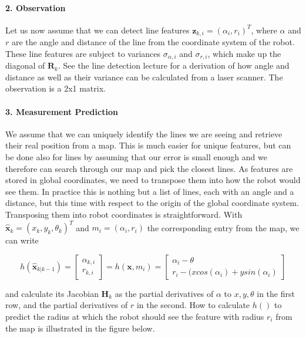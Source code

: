 \paragraph{2. Observation}
Let us now assume that we can detect line features $ \boldsymbol{z}_{k,i}=(\alpha_i,r_i)^T$, where $ \alpha$ and $ r$ are the angle and distance of the line from the coordinate system of the robot. These line features are subject to variances $ \sigma_{\alpha,i}$ and $ \sigma_{r,i}$, which make up the diagonal of $ \boldsymbol{R}_{k}$. See the line detection lecture for a derivation of how angle and distance as well as their variance can be calculated from a laser scanner. The observation is a 2x1 matrix.

\paragraph{3. Measurement Prediction}
We assume that we can uniquely identify the lines we are seeing and retrieve their real position from a map. This is much easier for unique features, but can be done also for lines by assuming that our error is small enough and we therefore can search through our map and pick the closest lines. As features are stored in global coordinates, we need to transpose them into how the robot would see them. In practice this is nothing but a list of lines, each with an angle and a distance, but this time with respect to the origin of the global coordinate system. Transposing them into robot coordinates is straightforward. With  $ \hat{\boldsymbol{x}}_{k}=(x_{k},y_{k},\theta_k)^T$ and $ m_i=(\alpha_i,r_i)$ the corresponding entry from the map, we can write

\begin{equation} h(\hat{\boldsymbol{x}}_{k|k-1})=\left[\begin{array}{c}\alpha_{k,i}\\r_{k,i}\end{array}\right]=h(\boldsymbol{x},m_i)=\left[\begin{array}{c}\alpha_i-\theta\\r_i-(x cos(\alpha_i)+y sin(\alpha_i)\end{array}\right]
\end{equation}

and calculate its Jacobian $ \boldsymbol{H}_{k}$ as the partial derivatives of $ \alpha$ to $ x,y,\theta$ in the first row, and the partial derivatives of $ r$ in the second. How to calculate $ h()$ to predict the radius at which the robot should see the feature with radius $ r_i$ from the map is illustrated in the figure below.


